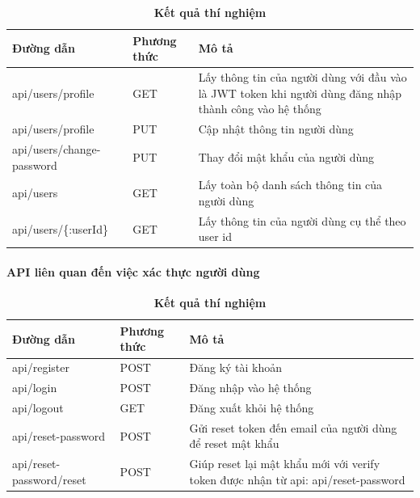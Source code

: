 \begin{table}[H]
     \centering
     \caption{\bfseries \fontsize{12pt}{0pt}\selectfont Kết quả thí nghiệm}
     \begin{tabularx}{0.9\textwidth}{
     | >{\raggedright\arraybackslash}X
     | >{\raggedright\arraybackslash}m{2cm}
     | >{\raggedright\arraybackslash}X|
     }
     \hline
     \bfseries Đường dẫn    &\bfseries Phương thức    &\bfseries Mô tả\\ \hline
    api/users/profile   &   GET  &  Lấy thông tin của người dùng với đầu vào là JWT token khi người dùng đăng nhập thành công vào hệ thống \\  \hline
    api/users/profile   &    PUT    &  Cập nhật thông tin người dùng \\  \hline
    api/users/change-password   &   PUT     & Thay đổi mật khẩu của người dùng  \\ \hline
    api/users   &     GET   & Lấy toàn bộ danh sách thông tin của người dùng \\  \hline
    api/users/\{:userId\}  &   GET     & Lấy thông tin của người dùng cụ thể theo user id \\ \hline

     \end{tabularx}
     \label{bang41}
\end{table}



\paragraph{API liên quan đến việc xác thực người dùng }
\mbox{}

\begin{table}[H]
  \centering
  \caption{\bfseries \fontsize{12pt}{0pt}\selectfont Kết quả thí nghiệm}
  \begin{tabularx}{0.9\textwidth}{
  | >{\raggedright\arraybackslash}X
  | >{\raggedright\arraybackslash}m{2cm}
  | >{\raggedright\arraybackslash}X|
  }
  \hline
  \bfseries Đường dẫn    &\bfseries Phương thức    &\bfseries Mô tả\\ \hline
 api/register   &   POST  & Đăng ký tài khoản \\ \hline
 api/login   &    POST    & Đăng nhập vào hệ thống \\ \hline
 api/logout  &   GET     & Đăng xuất khỏi hệ thống \\ \hline
 api/reset-password  &     POST   &  Gửi reset token đến email của người dùng để reset mật khẩu \\  \hline
 api/reset-password/reset &   POST     & Giúp reset lại mật khẩu mới với verify token được nhận từ api: api/reset-password  \\ \hline

  \end{tabularx}
  \label{bang41}
\end{table}



